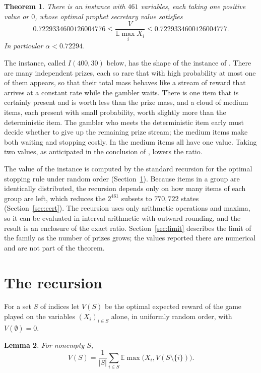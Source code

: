 \documentclass[11pt]{amsart}
\newtheorem{theorem}{Theorem}[section]
\newtheorem{lemma}[theorem]{Lemma}
\theoremstyle{remark}\newtheorem{remark}[theorem]{Remark}
\newcommand{\E}{\mathbb{E}}
\begin{document}
\begin{theorem}\label{thm:main}
There is an instance with $461$ variables, each taking one positive value or $0$, whose optimal prophet secretary value
satisfies
\[
0.7229334600126004776\le\frac{V}{\E\max_i X_i}\le0.7229334600126004777 .
\]
In particular $\alpha<0.72294$.
\end{theorem}

The instance, called $I(400,30)$ below, has the shape of the instance of \cite{gms}. There are many independent prizes,
each so rare that with high probability at most one of them appears, so that their total mass behaves like a stream of
reward that arrives at a constant rate while the gambler waits. There is one item that is certainly present and is worth
less than the prize mass, and a cloud of medium items, each present with small probability, worth slightly more than the
deterministic item. The gambler who meets the deterministic item early must decide whether to give up the remaining
prize stream; the medium items make both waiting and stopping costly. In \cite{gms} the medium items all have one value.
Taking two values, as anticipated in the conclusion of \cite{gms}, lowers the ratio.

The value of the instance is computed by the standard recursion for the optimal stopping rule under random order
(Section~\ref{sec:dp}). Because items in a group are identically distributed, the recursion depends only on how many items
of each group are left, which reduces the $2^{461}$ subsets to $770{,}722$ states (Section~\ref{sec:cert}). The
recursion uses only arithmetic operations and maxima, so it can be evaluated in interval
arithmetic with outward rounding, and the result is an enclosure of the exact ratio. Section~\ref{sec:limit} describes
the limit of the family as the number of prizes grows; the values reported there are numerical and are not part of the
theorem.

\section{The recursion}\label{sec:dp}

For a set $S$ of indices let $V(S)$ be the optimal expected reward of the game played on the variables $(X_i)_{i\in S}$
alone, in uniformly random order, with $V(\emptyset)=0$.

\begin{lemma}\label{lem:dp}
For nonempty $S$,
\[
V(S)=\frac1{|S|}\sum_{i\in S}\E\max\bigl(X_i,V(S\setminus\{i\})\bigr).
\]
\end{lemma}
\end{document}
